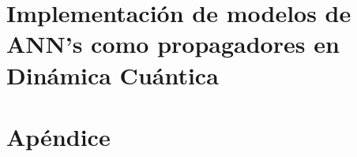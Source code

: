\documentclass[twoside,openright,titlepage,numbers=noenddot,%
                headinclude,footinclude,cleardoublepage=empty,abstract=on,
                BCOR=5mm,paper=a4,fontsize=12pt
                ]{scrreprt}
\begin{document}
\part{Implementación de modelos de ANN's como propagadores en Dinámica Cuántica }\label{pt:Modelos}




\appendix
\part{Apéndice}



\end{document}
